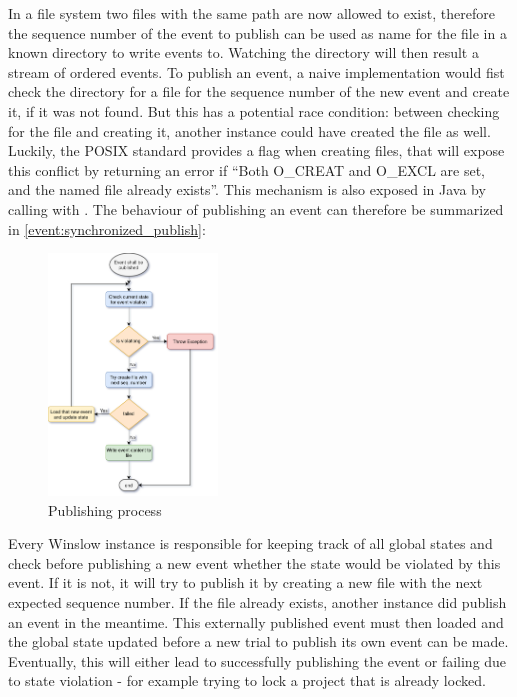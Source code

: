 In a file system two files with the same path are now allowed to exist, therefore the sequence number of the event to publish can be used as name for the file in a known directory to write events to.
Watching the directory will then result a stream of ordered events.
To publish an event, a naive implementation would fist check the directory for a file for the sequence number of the new event and create it, if it was not found.
But this has a potential race condition: between checking for the file and creating it, another instance could have created the file as well.
Luckily, the POSIX standard provides a flag when creating files, that will expose this conflict by returning an error if \enquote{Both O\_CREAT and O\_EXCL are set, and the named file already exists}\cite{gnu:open}.
This mechanism is also exposed in Java by calling \cite{javadoc:files:write} with \cite{javadoc:standard_open_options:create_new}.
The behaviour of publishing an event can therefore be summarized in \autoref{event:synchronized_publish}:

\begin{figure}
	\centering
	\includegraphics[width=0.4\textwidth]{event_publishing.png}
	\caption{Publishing process}
	\label{event:synchronized_publish}
\end{figure}

Every Winslow instance is responsible for keeping track of all global states and check before publishing a new event  whether the state would be violated by this event.
If it is not, it will try to publish it by creating a new file with the next expected sequence number.
If the file already exists, another instance did publish an event in the meantime.
This externally published event must then loaded and the global state updated before a new trial to publish its own event can be made.
Eventually, this will either lead to successfully publishing the event or failing due to state violation - for example trying to lock a project that is already locked.


